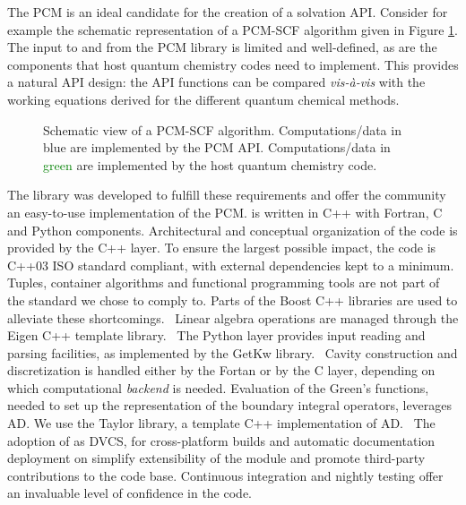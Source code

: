 The \acrshort{PCM} is an ideal candidate for the creation of a solvation
\acrshort{API}. Consider for example the schematic representation of a
\acrshort{PCM}-\acrshort{SCF} algorithm given in Figure \ref{fig:algorithm}.
The input to and from the \acrshort{PCM} library is limited and well-defined,
as are the components that host quantum chemistry codes need to
implement.
This provides a natural \acrshort{API} design: the \acrshort{API} functions can be
compared \emph{vis-à-vis} with the working equations derived for the
different quantum chemical methods.

\begin{figure}[tb]
\centering
\scalebox{0.7}{}
\caption[Modular approach to programming a \acrshort{PCM} functionality into an existing \acrshort{SCF} code.]{
Schematic view of a \acrshort{PCM}-\acrshort{SCF} algorithm. Computations/data in
\textcolor{PMS2229}{blue} are implemented by the \acrshort{PCM} \acrshort{API}.
Computations/data in \textcolor{Green}{green} are implemented by the
host quantum chemistry code.
  }
\label{fig:algorithm}
\end{figure}

The \pcmsolver library was developed to fulfill these requirements and
offer the community an easy-to-use implementation of the \acrshort{PCM}.
\pcmsolver is written in C++ with Fortran, C and Python components.
Architectural and conceptual organization of the code is provided by the
C++ layer. To ensure the largest possible impact, the code is C++03 ISO standard
compliant, with external dependencies kept to a minimum.
Tuples, container algorithms and functional programming tools are not
part of the standard we chose to comply to.
Parts of the Boost C++ libraries are used to alleviate these
shortcomings.~\autocite{boost}
Linear algebra operations are managed through the Eigen C++ template
library.~\autocite{eigen}
The Python layer provides input reading and parsing facilities,
as implemented by the GetKw library.~\autocite{libgetkw}
Cavity construction and discretization is handled either by the Fortan
or by the C layer, depending on which computational \emph{backend} is
needed.
Evaluation of the Green's functions, needed to set up the representation
of the boundary integral operators, leverages \gls{AD}. We use the Taylor library, a template C++
implementation of \acrshort{AD}.~\autocite{Bartholomew-Biggs2000-db, libtaylor}
The adoption of \git as \acrshort{DVCS}, \cmake for cross-platform builds and
automatic documentation deployment on \readthedocs simplify
extensibility of the module and promote third-party contributions to the
code base. Continuous integration and nightly testing offer an
invaluable level of confidence in the code.

